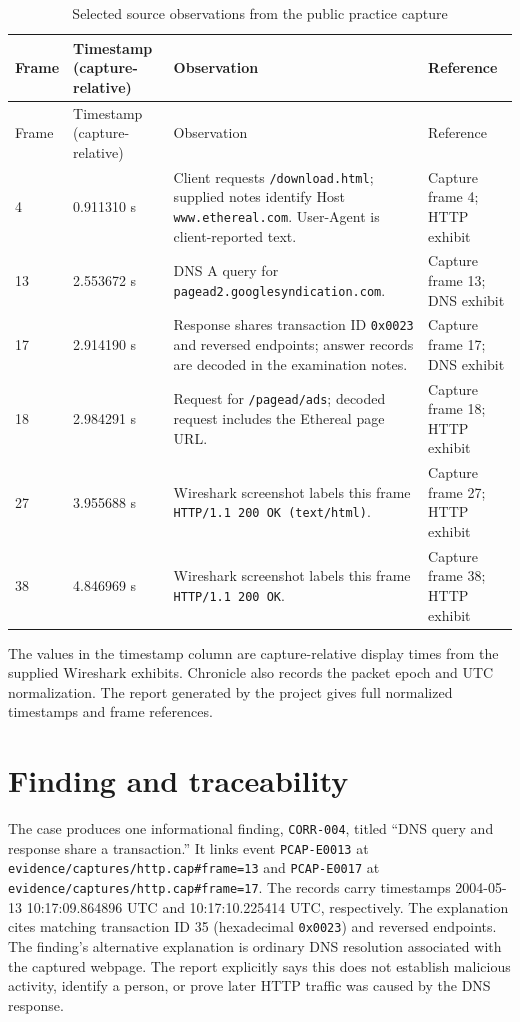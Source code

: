 \documentclass[12pt,a4paper]{report}
\begin{document}
\begin{longtable}{p{}p{}p{}p{}}
\caption{Selected source observations from the public practice capture}\\
\toprule Frame & Timestamp (capture-relative) & Observation & Reference\\
\midrule
\endfirsthead
\toprule Frame & Timestamp (capture-relative) & Observation & Reference\\
\midrule
\endhead
4 & 0.911310 s & Client requests \texttt{/download.html}; supplied notes identify Host \texttt{www.ethereal.com}. User-Agent is client-reported text. & Capture frame 4; HTTP exhibit\\
13 & 2.553672 s & DNS A query for \texttt{pagead2.googlesyndication.com}. & Capture frame 13; DNS exhibit\\
17 & 2.914190 s & Response shares transaction ID \texttt{0x0023} and reversed endpoints; answer records are decoded in the examination notes. & Capture frame 17; DNS exhibit\\
18 & 2.984291 s & Request for \texttt{/pagead/ads}; decoded request includes the Ethereal page URL. & Capture frame 18; HTTP exhibit\\
27 & 3.955688 s & Wireshark screenshot labels this frame \texttt{HTTP/1.1 200 OK (text/html)}. & Capture frame 27; HTTP exhibit\\
38 & 4.846969 s & Wireshark screenshot labels this frame \texttt{HTTP/1.1 200 OK}. & Capture frame 38; HTTP exhibit\\
\bottomrule
\end{longtable}
The values in the timestamp column are capture-relative display times from the supplied Wireshark exhibits. Chronicle also records the packet epoch and UTC normalization. The report generated by the project gives full normalized timestamps and frame references.

\section{Finding and traceability}
The case produces one informational finding, \texttt{CORR-004}, titled “DNS query and response share a transaction.” It links event \texttt{PCAP-E0013} at \texttt{evidence/captures/http.cap\#frame=13} and \texttt{PCAP-E0017} at \texttt{evidence/captures/http.cap\#frame=17}. The records carry timestamps 2004-05-13 10:17:09.864896 UTC and 10:17:10.225414 UTC, respectively. The explanation cites matching transaction ID 35 (hexadecimal \texttt{0x0023}) and reversed endpoints. The finding's alternative explanation is ordinary DNS resolution associated with the captured webpage. The report explicitly says this does not establish malicious activity, identify a person, or prove later HTTP traffic was caused by the DNS response.
\end{document}

